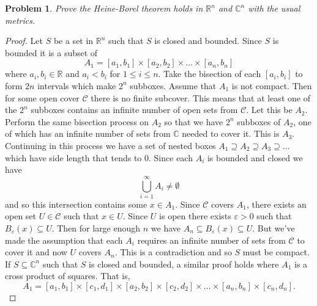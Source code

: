 \documentclass{article}
\newtheorem{problem}{Problem}
\begin{document}
\begin{flushleft}
\begin{problem}
Prove the Heine-Borel theorem holds in $\mathbb{R}^n$ and $\mathbb{C}^n$ with the usual metrics.
\end{problem}
\begin{proof}
Let $S$ be a set in $\mathbb{R}^n$ such that $S$ is closed and bounded. Since $S$ is bounded it is a subset of
\[
A_1 = [a_1, b_1] \times [a_2, b_2] \times \dots \times [a_n, b_n]
\]
where $a_i, b_i \in \mathbb{R}$ and $a_i < b_i$ for $1 \leq i \leq n$. Take the bisection of each $[a_i, b_i]$ to form $2n$ intervals which make $2^n$ subboxes. Assume that $A_1$ is not compact. Then for some open cover $\mathcal{C}$ there is no finite subcover. This means that at least one of the $2^n$ subboxes contains an infinite number of open sets from $\mathcal{C}$. Let this be $A_2$. Perform the same bisection process on $A_2$ so that we have $2^n$ subboxes of $A_2$, one of which has an infinite number of sets from $\mathbb{C}$ needed to cover it. This is $A_3$. Continuing in this process we have a set of nested boxes $A_1 \supseteq A_2 \supseteq A_3 \supseteq \dots$ which have side length that tends to $0$. Since each $A_i$ is bounded and closed we have
\[
\bigcup_{i=1}^{\infty} A_i \neq \emptyset
\]
and so this intersection contains some $x \in A_1$. Since $\mathcal{C}$ covers $A_1$, there exists an open set $U \in \mathcal{C}$ such that $x \in U$. Since $U$ is open there exists $\varepsilon > 0$ such that $B_{\varepsilon}(x) \subseteq U$. Then for large enough $n$ we have $A_n \subseteq B_{\varepsilon}(x) \subseteq U$. But we've made the assumption that each $A_i$ requires an infinite number of sets from $\mathcal{C}$ to cover it and now $U$ covers $A_n$. This is a contradiction and so $S$ must be compact. If $S \subseteq \mathbb{C}^n$ such that $S$ is closed and bounded, a similar proof holds where $A_1$ is a cross product of squares. That is,
\[
A_1 = [a_1, b_1] \times [c_1, d_1] \times [a_2, b_2] \times [c_2, d_2] \times \dots \times [a_n, b_n] \times [c_n, d_n].
\]
\end{proof}


\end{flushleft}
\end{document}
